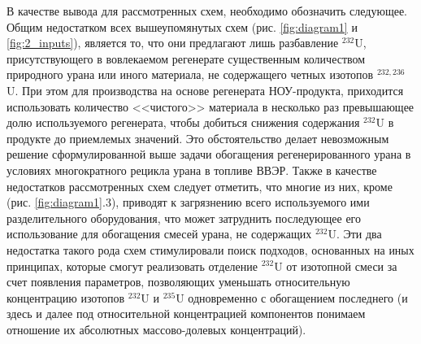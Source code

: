 


В качестве вывода для рассмотренных схем, необходимо обозначить следующее. Общим недостатком всех вышеупомянутых схем (рис. \ref{fig:diagram1} и \ref{fig:2_inputs}), является то, что они предлагают лишь разбавление $^{232}$U, присутствующего в вовлекаемом регенерате существенным количеством природного урана или иного материала, не содержащего четных изотопов $^{232,236}$U. При этом для производства на основе регенерата НОУ-продукта, приходится использовать количество <<чистого>> материала в несколько раз превышающее долю используемого регенерата, чтобы добиться снижения содержания $^{232}$U в продукте до приемлемых значений. Это обстоятельство делает невозможным решение сформулированной выше задачи обогащения регенерированного урана в условиях многократного рецикла урана в топливе ВВЭР. Также в качестве недостатков рассмотренных схем следует отметить, что многие из них, кроме (рис. \ref{fig:diagram1}.3), приводят к загрязнению всего используемого ими разделительного оборудования, что может затруднить последующее его использование для обогащения смесей урана, не содержащих $^{232}$U. Эти два недостатка такого рода схем стимулировали поиск подходов, основанных на иных принципах, которые смогут реализовать отделение $^{232}$U от изотопной смеси за счет появления параметров, позволяющих уменьшать относительную концентрацию изотопов $^{232}$U и $^{235}$U одновременно с обогащением последнего (и здесь и далее под относительной концентрацией компонентов понимаем отношение их абсолютных массово-долевых концентраций).


